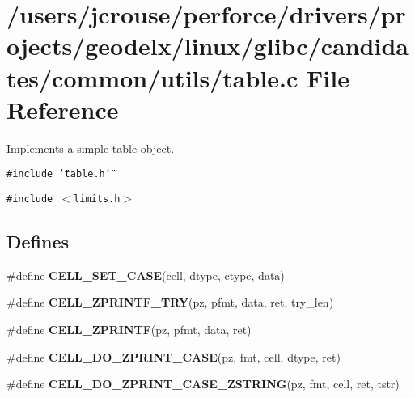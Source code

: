 \section{/users/jcrouse/perforce/drivers/projects/geodelx/linux/glibc/candidates/common/utils/table.c File Reference}
\label{table_8c}
Implements a simple table object. 


{\tt \#include \char`\"{}table.h\char`\"{}}\par
{\tt \#include $<$limits.h$>$}\par
\subsection*{Defines}
\begin{CompactItemize}
\item 
\#define {\bf CELL\_\-SET\_\-CASE}(cell, dtype, ctype, data)
\item 
\#define {\bf CELL\_\-ZPRINTF\_\-TRY}(pz, pfmt, data, ret, try\_\-len)
\item 
\#define {\bf CELL\_\-ZPRINTF}(pz, pfmt, data, ret)
\item 
\#define {\bf CELL\_\-DO\_\-ZPRINT\_\-CASE}(pz, fmt, cell, dtype, ret)
\item 
\#define {\bf CELL\_\-DO\_\-ZPRINT\_\-CASE\_\-ZSTRING}(pz, fmt, cell, ret, tstr)
\end{CompactItemize}
